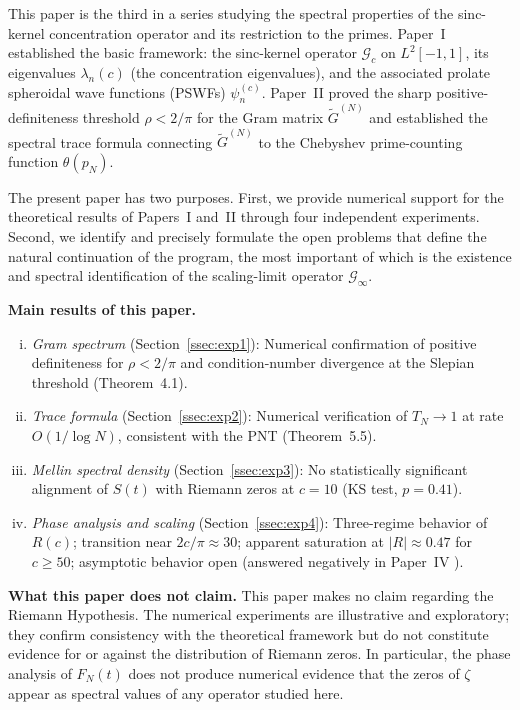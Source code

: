 \documentclass[12pt,a4paper]{amsart}
\theoremstyle{definition}
\newcommand{\Gc}{\mathcal{G}_c}
\newcommand{\Gcinf}{\mathcal{G}_\infty}
\begin{document}
This paper is the third in a series studying the spectral properties
of the sinc-kernel concentration operator and its restriction to
the primes. Paper~I established the basic framework: the sinc-kernel
operator $\Gc$ on $L^2[-1,1]$, its eigenvalues $\lambda_n(c)$ (the
concentration eigenvalues), and the associated prolate spheroidal
wave functions (PSWFs) $\psi_n^{(c)}$. Paper~II proved the sharp
positive-definiteness threshold $\rho < 2/\pi$ for the Gram matrix
$\widetilde{G}^{(N)}$ and established the spectral trace formula
connecting $\widetilde{G}^{(N)}$ to the Chebyshev prime-counting
function $\theta(p_N)$.

The present paper has two purposes. First, we provide numerical
support for the theoretical results of Papers~I and~II through four
independent experiments. Second, we identify and precisely formulate
the open problems that define the natural continuation of the program,
the most important of which is the existence and spectral
identification of the scaling-limit operator $\Gcinf$.

\medskip
\noindent\textbf{Main results of this paper.}
\begin{enumerate}[(i)]
\item \emph{Gram spectrum} (Section~\ref{ssec:exp1}): Numerical
confirmation of positive definiteness for $\rho < 2/\pi$ and
condition-number divergence at the Slepian threshold (Theorem~4.1).
\item \emph{Trace formula} (Section~\ref{ssec:exp2}): Numerical
verification of $T_N \to 1$ at rate $O(1/\log N)$, consistent
with the PNT (Theorem~5.5).
\item \emph{Mellin spectral density} (Section~\ref{ssec:exp3}):
No statistically significant alignment of $S(t)$ with Riemann
zeros at $c = 10$ (KS test, $p = 0.41$).
\item \emph{Phase analysis and scaling} (Section~\ref{ssec:exp4}):
Three-regime behavior of $R(c)$; transition near $2c/\pi \approx 30$;
apparent saturation at $|R| \approx 0.47$ for $c \geq 50$;
asymptotic behavior open (answered negatively in Paper~IV \cite{PaperIV}).
\end{enumerate}

\medskip
\noindent\textbf{What this paper does not claim.}
This paper makes no claim regarding the Riemann Hypothesis.
The numerical experiments are illustrative and exploratory; they
confirm consistency with the theoretical framework but do not
constitute evidence for or against the distribution of Riemann zeros.
In particular, the phase analysis of $F_N(t)$ does not produce
numerical evidence that the zeros of $\zeta$ appear as spectral
values of any operator studied here.
\end{document}
